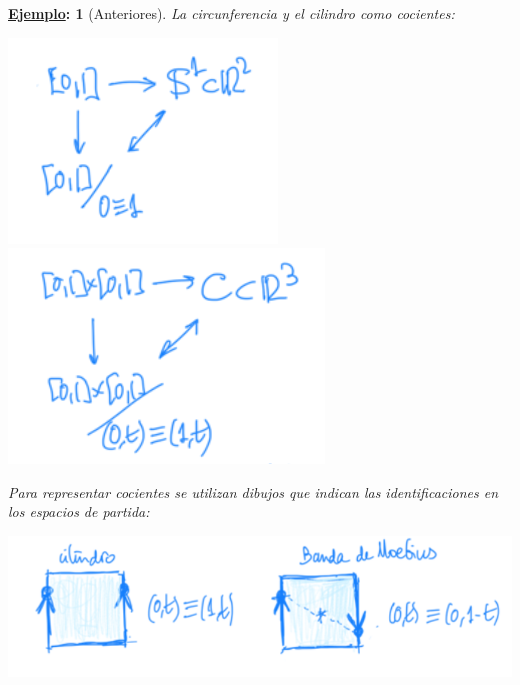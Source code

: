 \documentclass[10pt,a4paper,openright]{book}
\theoremstyle{break}
\newtheorem*{ej}{\underline{Ejemplo}:}
\begin{document}
\begin{ej}[Anteriores]
La circunferencia y el cilindro como cocientes:
\begin{center}
    \includegraphics[scale=0.4]{images/ej_cociente_1} 
    \includegraphics[scale=0.4]{images/ej_cociente_2}
\end{center}

Para representar cocientes se utilizan dibujos que indican las identificaciones en los espacios de partida:
\begin{center}
    \includegraphics[scale=0.3]{images/ej_cociente_3} 
\end{center}
\end{ej}
\end{document}
